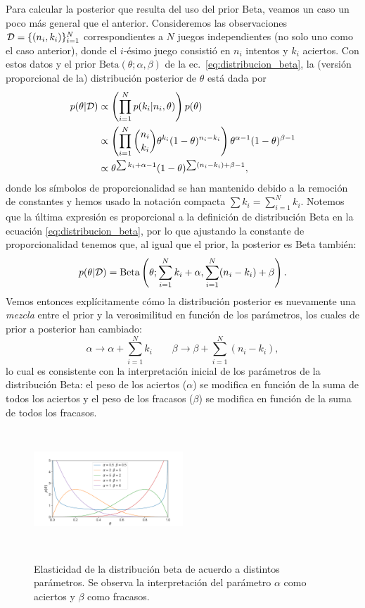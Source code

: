 Para calcular la posterior que resulta del uso del prior Beta, veamos un caso un poco más general que el anterior. Consideremos las observaciones ${\mathcal D} = \{(n_i,k_i)\}_{i=1}^N$ correspondientes a $N$ juegos independientes (no solo uno como el caso anterior), donde el $i$-ésimo juego consistió en $n_i$ intentos y $k_i$ aciertos. Con estos datos y el prior $\text{Beta}(\theta;\alpha,\beta)$ de la ec.~\eqref{eq:distribucion_beta}, la (versión proporcional de la) distribución posterior de $\theta$ está dada por
\begin{align}
	p(\theta|{\mathcal D}) & 	\propto \left(\prod_{i=1}^N  p(k_i|n_i,\theta)\right)p(\theta)  \\
			 & \propto  \left(\prod_{i=1}^N\binom{n_i}{k_i}\theta^{k_i}(1-\theta)^{n_i-k_i}\right)\theta^{\alpha-1}(1-\theta)^{\beta-1} \nonumber\\
			 & \propto  \theta^{\sum k_i + \alpha - 1}(1-\theta)^{\sum (n_i-k_i) + \beta-1}, \nonumber
\end{align}
donde los símbolos de proporcionalidad se han mantenido debido a la remoción de constantes y hemos usado la notación compacta $\sum k_i = \sum_{i=1}^N k_i$. Notemos que la última expresión es proporcional a la definición de distribución Beta en la ecuación \eqref{eq:distribucion_beta}, por lo que ajustando la constante de proporcionalidad tenemos que, al igual que el prior, la posterior es Beta también: 
\begin{equation}
	p(\theta|{\mathcal D}) = \text{Beta}\left(\theta;\sum_{i=1}^N k_i + \alpha,\sum_{i=1}^N (n_i-k_i) + \beta\right).
\end{equation}
Vemos entonces explícitamente cómo la distribución posterior es nuevamente una \emph{mezcla} entre el prior y la verosimilitud en función de los parámetros, los cuales de prior a posterior han cambiado: 
\begin{equation}
	\alpha \to \alpha + \sum_{i=1}^N k_i \qquad \beta  \to \beta + \sum_{i=1}^N (n_i-k_i) \label{eq:bayes_update_bin},
\end{equation}
lo cual es consistente con la interpretación inicial de los parámetros de la distribución Beta: el peso de los aciertos ($\alpha$) se modifica en función de la suma de todos los aciertos y el peso de los fracasos ($\beta$) se modifica en función de la suma de todos los fracasos.

\begin{figure}[h]
	\centering
	\includegraphics[width=0.5\textwidth, height=4.5cm]{img/cap2_beta.pdf}\\
	\caption{Elasticidad de la distribución beta de acuerdo a distintos parámetros. Se observa la interpretación del parámetro $\alpha$ como aciertos y $\beta$ como fracasos.}
\end{figure}


